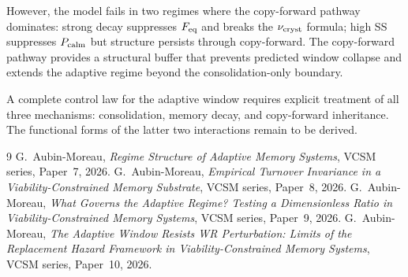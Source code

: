 \documentclass[11pt]{article}
\begin{document}
However, the model fails in two regimes where the copy-forward pathway dominates:
strong decay suppresses $F_{\rm eq}$ and breaks the $\nu_{\rm cryst}$ formula;
high SS suppresses $P_{\rm calm}$ but structure persists through copy-forward.
The copy-forward pathway provides a structural buffer that prevents predicted window
collapse and extends the adaptive regime beyond the consolidation-only boundary.

A complete control law for the adaptive window requires explicit treatment of
all three mechanisms: consolidation, memory decay, and copy-forward inheritance.
The functional forms of the latter two interactions remain to be derived.

\begin{thebibliography}{9}
G.~Aubin-Moreau,
\textit{Regime Structure of Adaptive Memory Systems},
VCSM series, Paper~7, 2026.
G.~Aubin-Moreau,
\textit{Empirical Turnover Invariance in a Viability-Constrained Memory Substrate},
VCSM series, Paper~8, 2026.
G.~Aubin-Moreau,
\textit{What Governs the Adaptive Regime? Testing a Dimensionless Ratio in
Viability-Constrained Memory Systems},
VCSM series, Paper~9, 2026.
G.~Aubin-Moreau,
\textit{The Adaptive Window Resists WR Perturbation: Limits of the
Replacement Hazard Framework in Viability-Constrained Memory Systems},
VCSM series, Paper~10, 2026.
\end{thebibliography}
\end{document}
